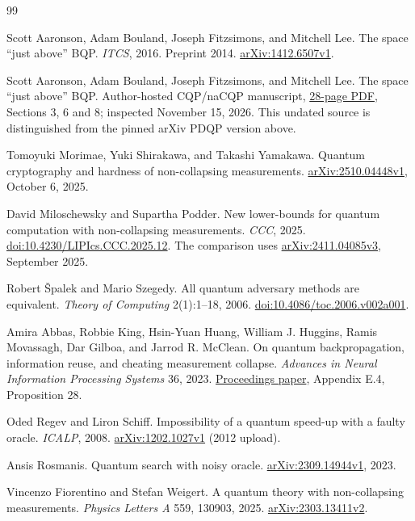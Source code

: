 \documentclass[11pt]{article}
\theoremstyle{remark}
\begin{document}
\begin{thebibliography}{99}
\small
\raggedright
{}
Scott Aaronson, Adam Bouland, Joseph Fitzsimons, and Mitchell Lee.
The space ``just above'' BQP.
\emph{ITCS}, 2016. Preprint 2014.
\href{https://arxiv.org/abs/1412.6507v1}{arXiv:1412.6507v1}.

Scott Aaronson, Adam Bouland, Joseph Fitzsimons, and Mitchell Lee.
The space ``just above'' BQP. Author-hosted CQP/naCQP manuscript,
\href{https://theory.stanford.edu/~abouland/Papers/cqp.pdf}{28-page PDF},
Sections 3, 6 and 8; inspected November 15, 2026. This undated source is
distinguished from the pinned arXiv PDQP version above.

Tomoyuki Morimae, Yuki Shirakawa, and Takashi Yamakawa.
Quantum cryptography and hardness of non-collapsing measurements.
\href{https://arxiv.org/abs/2510.04448v1}{arXiv:2510.04448v1}, October 6, 2025.

David Miloschewsky and Supartha Podder.
New lower-bounds for quantum computation with non-collapsing measurements.
\emph{CCC}, 2025.
\href{https://doi.org/10.4230/LIPIcs.CCC.2025.12}{doi:10.4230/LIPIcs.CCC.2025.12}.
The comparison uses \href{https://arxiv.org/abs/2411.04085v3}{arXiv:2411.04085v3},
September 2025.

Robert \v{S}palek and Mario Szegedy.
All quantum adversary methods are equivalent.
\emph{Theory of Computing} 2(1):1--18, 2006.
\href{https://doi.org/10.4086/toc.2006.v002a001}{doi:10.4086/toc.2006.v002a001}.

Amira Abbas, Robbie King, Hsin-Yuan Huang, William J. Huggins,
Ramis Movassagh, Dar Gilboa, and Jarrod R. McClean.
On quantum backpropagation, information reuse, and cheating measurement collapse.
\emph{Advances in Neural Information Processing Systems} 36, 2023.
\href{https://proceedings.neurips.cc/paper_files/paper/2023/file/8c3caae2f725c8e2a55ecd600563d172-Paper-Conference.pdf}{Proceedings paper},
Appendix E.4, Proposition 28.

Oded Regev and Liron Schiff.
Impossibility of a quantum speed-up with a faulty oracle.
\emph{ICALP}, 2008.
\href{https://arxiv.org/abs/1202.1027v1}{arXiv:1202.1027v1} (2012 upload).

Ansis Rosmanis.
Quantum search with noisy oracle.
\href{https://arxiv.org/abs/2309.14944v1}{arXiv:2309.14944v1}, 2023.

Vincenzo Fiorentino and Stefan Weigert.
A quantum theory with non-collapsing measurements.
\emph{Physics Letters A} 559, 130903, 2025.
\href{https://arxiv.org/abs/2303.13411v2}{arXiv:2303.13411v2}.


\end{thebibliography}
\end{document}
